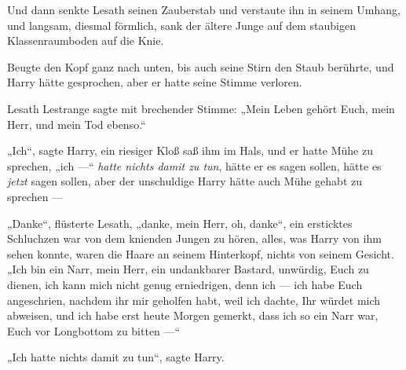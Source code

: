 Und dann senkte Lesath seinen Zauberstab und verstaute ihn in seinem Umhang, und langsam, diesmal förmlich, sank der ältere Junge auf dem staubigen Klassenraumboden auf die Knie.

Beugte den Kopf ganz nach unten, bis auch seine Stirn den Staub berührte, und Harry hätte gesprochen, aber er hatte seine Stimme verloren.

Lesath Lestrange sagte mit brechender Stimme:
„Mein Leben gehört Euch, mein Herr, und mein Tod ebenso.“

„Ich“, sagte Harry, ein riesiger Kloß saß ihm im Hals, und er hatte Mühe zu sprechen, „ich —“ \emph{hatte nichts damit zu tun}, hätte er es sagen sollen, hätte es \emph{jetzt} sagen sollen, aber der unschuldige Harry hätte auch Mühe gehabt zu sprechen —

„Danke“, flüsterte Lesath, „danke, mein Herr, oh, danke“, ein ersticktes Schluchzen war von dem knienden Jungen zu hören, alles, was Harry von ihm sehen konnte, waren die Haare an seinem Hinterkopf, nichts von seinem Gesicht.
„Ich bin ein Narr, mein Herr, ein undankbarer Bastard, unwürdig, Euch zu dienen, ich kann mich nicht genug erniedrigen, denn ich — ich habe Euch angeschrien, nachdem ihr mir geholfen habt, weil ich dachte, Ihr würdet mich abweisen, und ich habe erst heute Morgen gemerkt, dass ich so ein Narr war, Euch vor Longbottom zu bitten —“

„Ich hatte nichts damit zu tun“, sagte Harry.

